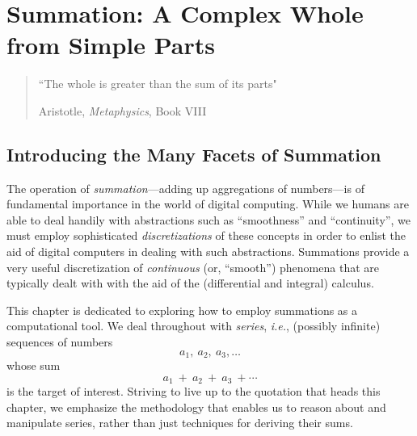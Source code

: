 
\chapter{Summation:
A Complex Whole from Simple Parts}
\label{ch:Summation}

\begin{quote}
``The whole is greater than the sum of its parts"

\hspace*{1.25in} Aristotle, {\it Metaphysics}, Book VIII
\end{quote}


\section{Introducing the Many Facets of Summation}
\label{sec:intro}

The operation of {\it summation}---adding up aggregations of numbers---is of fundamental importance in the world of digital computing.  While we humans are able to deal handily with abstractions such as ``smoothness'' and ``continuity'', we must employ sophisticated {\em discretizations} of these concepts in order to enlist the aid of digital computers in dealing with such abstractions.  Summations provide a very useful discretization of {\em continuous} (or,
``smooth'') phenomena that are typically dealt with with the aid of the (differential and integral) calculus.

\medskip

This chapter is dedicated to exploring how to employ summations as a computational tool.  We deal throughout with {\it series}, {\it i.e.}, (possibly infinite) sequences of numbers
\[ a_1, \ a_2, \ a_3, \ldots \]
whose sum
\begin{equation}
\label{eq:abstract-sum}
a_1 \ + \ a_2 \ + \ a_3 \ + \cdots
\end{equation}
is the target of interest.  Striving to live up to the quotation that heads this chapter, we emphasize the methodology that enables us to reason about and manipulate series, rather than just techniques for deriving their sums.

\medskip


